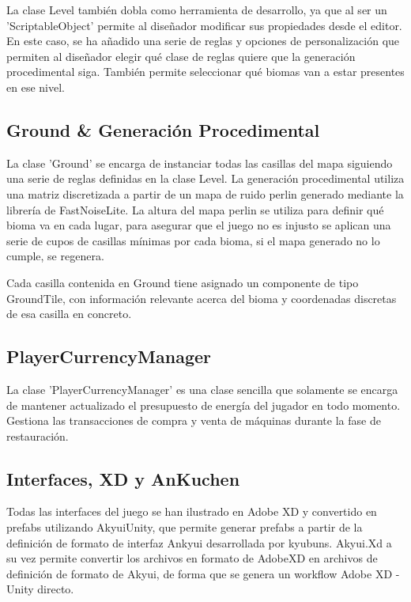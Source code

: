 La clase Level también dobla como herramienta de desarrollo, ya que al ser un 'ScriptableObject' permite al diseñador modificar sus propiedades desde el editor. En este caso, se ha añadido una serie de reglas y opciones de personalización que permiten al diseñador elegir qué clase de reglas quiere que la generación procedimental siga. También permite seleccionar qué biomas van a estar presentes en ese nivel. 

\subsection{Ground \& Generación Procedimental}

La clase 'Ground' se encarga de instanciar todas las casillas del mapa siguiendo una serie de reglas definidas en la clase Level. La generación procedimental utiliza una matriz discretizada a partir de un mapa de ruido perlin generado mediante la librería de FastNoiseLite\cite{FastNoiseLite}. La altura del mapa perlin se utiliza para definir qué bioma va en cada lugar, para asegurar que el juego no es injusto se aplican una serie de cupos de casillas mínimas por cada bioma, si el mapa generado no lo cumple, se regenera.

Cada casilla contenida en Ground tiene asignado un componente de tipo GroundTile, con información relevante acerca del bioma y coordenadas discretas de esa casilla en concreto. 

\subsection{PlayerCurrencyManager}

La clase 'PlayerCurrencyManager' es una clase sencilla que solamente se encarga de mantener actualizado el presupuesto de energía del jugador en todo momento. Gestiona las transacciones de compra y venta de máquinas durante la fase de restauración.

\subsection{Interfaces, XD y AnKuchen}

Todas las interfaces del juego se han ilustrado en Adobe XD y convertido en prefabs utilizando AkyuiUnity\cite{AkyuiUnity}, que permite generar prefabs a partir de la definición de formato de interfaz Ankyui desarrollada por kyubuns. Akyui.Xd a su vez permite convertir los archivos en formato de AdobeXD en archivos de definición de formato de Akyui, de forma que se genera un workflow Adobe XD - Unity directo.

